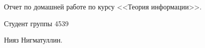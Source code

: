 
\begin{titlepage}

\begin{center}
\Large \Large Отчет по домашней работе по курсу <<Теория информации>>.
  
Студент группы 4539

Нияз Нигматуллин.
\end{center}

\end{titlepage}